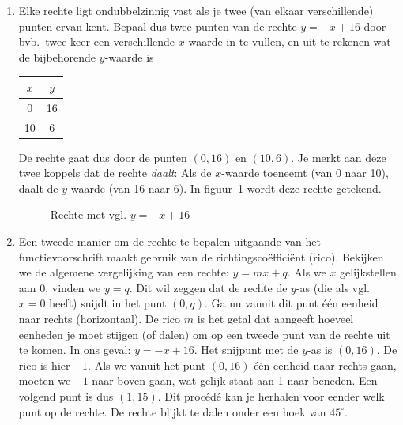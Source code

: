 \begin{enumerate}
    \item  Elke rechte ligt ondubbelzinnig vast als je twee (van elkaar
verschillende) punten ervan kent. Bepaal dus twee punten van
de rechte $y=-x+16$ door bvb.\ twee keer een verschillende $x$-waarde
in te vullen, en uit te rekenen wat de bijbehorende $y$-waarde
is 

\begin{center}
    \begin{tabular}{c|c}
    $x$ & $y$  \\
    \hline
    0 & 16  \\
    10 & 6  \\
\end{tabular}


\end{center}

De rechte gaat dus door de punten $(0,16)$ en $(10,6)$. Je merkt
aan deze twee koppels dat de rechte \emph{daalt}: Als de $x$-waarde
toeneemt (van 0 naar 10), daalt de $y$-waarde (van 16 naar
6). In figuur~\ref{fig:maxdierrechte} wordt deze rechte getekend.

\begin{figure}[htbp]
    \centering
{}
\caption{Rechte met vgl. $y=-x+16$}
    \label{fig:maxdierrechte}
\end{figure}

    \item  Een tweede manier om de rechte te bepalen uitgaande van het functievoorschrift
maakt gebruik van de richtingsco\"{e}ffici\"{e}nt (rico). Bekijken
we de algemene vergelijking van een rechte: $y=mx+q$.
Als we $x$ gelijkstellen aan 0, vinden we $y=q$. Dit
wil zeggen dat de rechte de $y$-as (die als vgl.\ $x=0$ heeft)
snijdt in het punt $(0,q)$. Ga nu vanuit dit punt \'e\'en eenheid naar
rechts (horizontaal). De rico $m$ is het getal dat aangeeft hoeveel eenheden 
je moet stijgen (of dalen) om op een tweede punt van de rechte
uit te komen. In ons geval: $y=-x+16$. Het snijpunt
met de $y$-as is $(0,16)$. De rico is hier $-1$. Als we vanuit het
punt $(0,16)$ \'e\'en eenheid naar rechts gaan, moeten we $-1$ naar boven
gaan, wat gelijk staat aan 1 naar beneden. Een volgend punt is
dus $(1,15)$. Dit proc\'ed\'e kan je herhalen voor eender welk punt op de rechte. De rechte blijkt te dalen onder een hoek van
$45^{\circ}$.
\end{enumerate}


